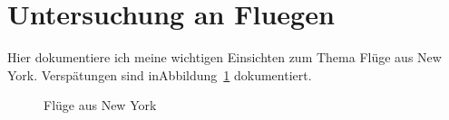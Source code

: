 \documentclass{article}
\begin{document}
\section{Untersuchung an Fluegen}
Hier dokumentiere ich meine wichtigen Einsichten zum Thema Flüge aus New York.
Verspätungen sind inAbbildung~\ref{fig:flights} dokumentiert.

\begin{figure}[htb]
  \caption{Flüge aus New York}\label{fig:flights}
\end{figure}
\end{document}
